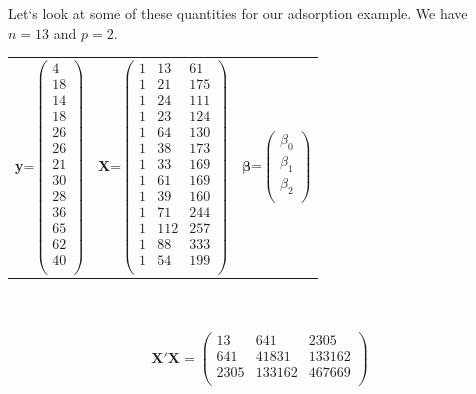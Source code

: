Let`s look at some of these quantities for our adsorption example.  We have $n=13$ and $p=2$.
\begin{center}
\begin{tabular}{ccc}
\textbf{y}=$\left(\begin{array}{c} 4 \\18\\14\\18\\26\\26\\21\\30\\28\\36\\65\\62\\40\\\end{array}\right)$ &
\textbf{X}=$\left(\begin{array}{ccc}1&13& 61\\1&21&175\\1&24&111\\1&23&124\\1&64&130\\1&38&173\\1&33&169\\1&61&169\\1&39&160\\1&71&244\\1&112&257\\1&88&333\\1&54&199\\\end{array}\right)$&
$\boldsymbol{\beta}$=$\left(\begin{array}{c} \beta_0 \\\beta_1\\\beta_2\\\end{array}\right)$ 
\end{tabular}
\end{center}
~\\~\\
$$\textbf{X}'\textbf{X} = \left(\begin{array}{ccc} 13&641&2305\\ 641&41831 & 133162\\ 2305&133162 &467669\\\end{array}\right)$$
~\\~\\
